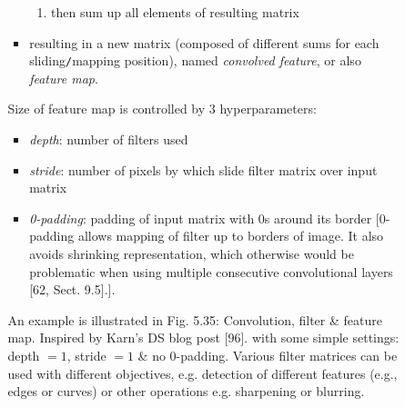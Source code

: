 \documentclass{article}
\begin{document}
\begin{itemize}
\begin{itemize}
\begin{itemize}
\begin{itemize}
\begin{enumerate}
					\item then sum up all elements of resulting matrix
				\end{enumerate}
				\item resulting in a new matrix (composed of different sums for each sliding{\tt/}mapping position), named {\it convolved feature}, or also {\it feature map}.
			\end{itemize}
			Size of feature map is controlled by 3 hyperparameters:
			\begin{itemize}
				\item {\it depth}: number of filters used
				\item {\it stride}: number of pixels by which slide filter matrix over input matrix
				\item {\it0-padding}: padding of input matrix with 0s around its border [0-padding allows mapping of filter up to borders of image. It also avoids shrinking representation, which otherwise would be problematic when using multiple consecutive convolutional layers [62, Sect. 9.5].].
			\end{itemize}
			An example is illustrated in {\sf Fig. 5.35: Convolution, filter \& feature map. Inspired by {\sc Karn}'s DS blog post [96].} with some simple settings: depth $= 1$, stride $= 1$ \& no 0-padding. Various filter matrices can be used with different objectives, e.g. detection of different features (e.g., edges or curves) or other operations e.g. sharpening or blurring.


\end{itemize}
\end{itemize}
\end{itemize}
\end{document}
